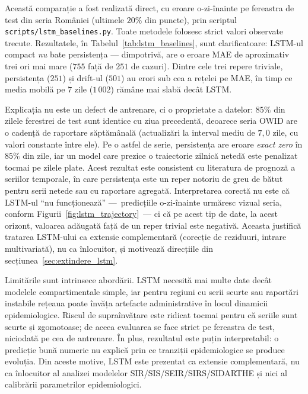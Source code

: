Această comparație a fost realizată direct, cu eroare o-zi-înainte pe fereastra de
test din seria României (ultimele $20\%$ din puncte), prin scriptul
\texttt{scripts/lstm\_baselines.py}. Toate metodele folosesc strict valori
observate trecute. Rezultatele, în Tabelul~\ref{tab:lstm_baselines}, sunt
clarificatoare: LSTM-ul compact \emph{nu} bate persistența --- dimpotrivă, are o
eroare MAE de aproximativ trei ori mai mare ($755$ față de $251$ de cazuri).
Dintre cele trei repere triviale, persistența ($251$) și drift-ul ($501$) au
erori sub cea a rețelei pe MAE, în timp ce media mobilă pe $7$ zile ($1\,002$)
rămâne mai slabă decât LSTM.



Explicația nu este un defect de antrenare, ci o proprietate a datelor:
$85\%$ din zilele ferestrei de test sunt identice cu ziua precedentă, deoarece
seria OWID are o cadență de raportare săptămânală (actualizări la interval mediu
de $7{,}0$ zile, cu valori constante între ele). Pe o astfel de serie,
persistența are eroare \emph{exact zero} în $85\%$ din zile, iar un model care
prezice o traiectorie zilnică netedă este penalizat tocmai pe zilele plate. Acest
rezultat este consistent cu literatura de prognoză a seriilor temporale, în care
persistența este un reper notoriu de greu de bătut pentru serii netede sau cu
raportare agregată. Interpretarea corectă nu este că LSTM-ul ``nu funcționează''
---~predicțiile o-zi-înainte urmăresc vizual seria, conform
Figurii~\ref{fig:lstm_trajectory}~--- ci că pe acest tip de date, la acest
orizont, valoarea adăugată față de un reper trivial este negativă. Aceasta
justifică tratarea LSTM-ului ca extensie complementară (corecție de reziduuri,
intrare multivariată), nu ca înlocuitor, și motivează direcțiile din
secțiunea~\ref{sec:extindere_lstm}.

Limitările sunt intrinsece abordării. LSTM necesită mai multe date decât
modelele compartimentale simple, iar pentru regiuni cu serii scurte sau
raportări instabile rețeaua poate învăța artefacte administrative în locul
dinamicii epidemiologice. Riscul de supraînvățare este ridicat tocmai pentru că
seriile sunt scurte și zgomotoase; de aceea evaluarea se face strict pe fereastra
de test, niciodată pe cea de antrenare. În plus, rezultatul este puțin
interpretabil: o predicție bună numeric nu explică prin ce tranziții
epidemiologice se produce evoluția. Din aceste motive, LSTM este prezentat ca
extensie complementară, nu ca înlocuitor al analizei modelelor
SIR/SIS/SEIR/SIRS/SIDARTHE și nici al calibrării parametrilor epidemiologici.

